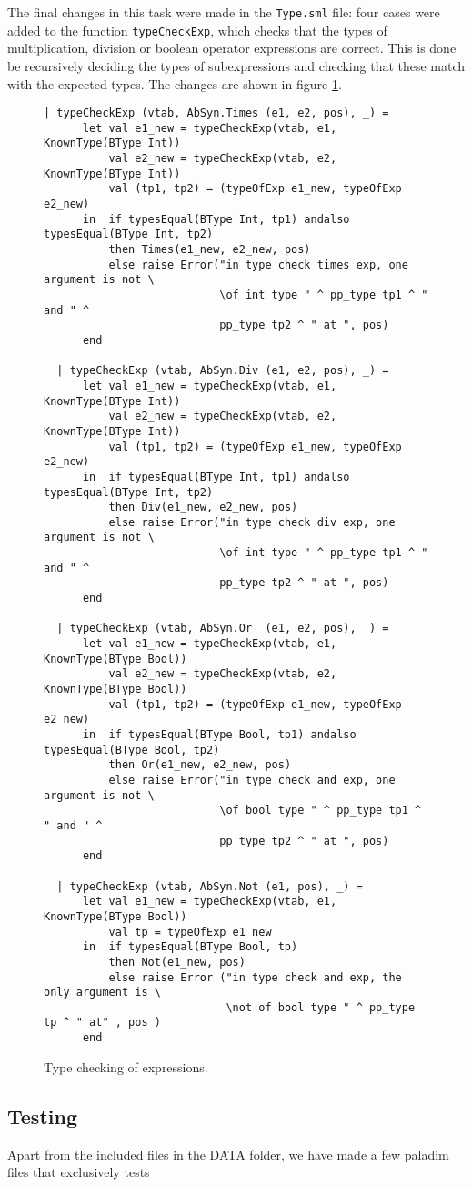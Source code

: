 \noindent
The final changes in this task were made in the \verb|Type.sml| file: four
cases were added to the function \verb|typeCheckExp|, which checks that the
types of multiplication, division or boolean operator expressions are correct.
This is done be recursively deciding the types of subexpressions and checking
that these match with the expected types. The changes are shown in figure
\ref{fig_expTypeCheck}.
\begin{figure}[H]
  \begin{lstlisting}[style=MLStyle]
  | typeCheckExp (vtab, AbSyn.Times (e1, e2, pos), _) =
      let val e1_new = typeCheckExp(vtab, e1, KnownType(BType Int))
          val e2_new = typeCheckExp(vtab, e2, KnownType(BType Int))
          val (tp1, tp2) = (typeOfExp e1_new, typeOfExp e2_new)
      in  if typesEqual(BType Int, tp1) andalso typesEqual(BType Int, tp2)
          then Times(e1_new, e2_new, pos)
          else raise Error("in type check times exp, one argument is not \
                           \of int type " ^ pp_type tp1 ^ " and " ^
                           pp_type tp2 ^ " at ", pos)
      end

  | typeCheckExp (vtab, AbSyn.Div (e1, e2, pos), _) =
      let val e1_new = typeCheckExp(vtab, e1, KnownType(BType Int))
          val e2_new = typeCheckExp(vtab, e2, KnownType(BType Int))
          val (tp1, tp2) = (typeOfExp e1_new, typeOfExp e2_new)
      in  if typesEqual(BType Int, tp1) andalso typesEqual(BType Int, tp2)
          then Div(e1_new, e2_new, pos)
          else raise Error("in type check div exp, one argument is not \
                           \of int type " ^ pp_type tp1 ^ " and " ^
                           pp_type tp2 ^ " at ", pos)
      end

  | typeCheckExp (vtab, AbSyn.Or  (e1, e2, pos), _) =
      let val e1_new = typeCheckExp(vtab, e1, KnownType(BType Bool))
          val e2_new = typeCheckExp(vtab, e2, KnownType(BType Bool))
          val (tp1, tp2) = (typeOfExp e1_new, typeOfExp e2_new)
      in  if typesEqual(BType Bool, tp1) andalso typesEqual(BType Bool, tp2)
          then Or(e1_new, e2_new, pos)        
          else raise Error("in type check and exp, one argument is not \
                           \of bool type " ^ pp_type tp1 ^ " and " ^
                           pp_type tp2 ^ " at ", pos)
      end

  | typeCheckExp (vtab, AbSyn.Not (e1, pos), _) =
      let val e1_new = typeCheckExp(vtab, e1, KnownType(BType Bool))
          val tp = typeOfExp e1_new
      in  if typesEqual(BType Bool, tp)
          then Not(e1_new, pos)
          else raise Error ("in type check and exp, the only argument is \
                            \not of bool type " ^ pp_type tp ^ " at" , pos )
      end
  \end{lstlisting}
  \caption{Type checking of expressions.}
  \label{fig_expTypeCheck}
\end{figure}


\subsection{Testing}
Apart from the included files in the DATA folder, we have made a few paladim
files that exclusively tests 
